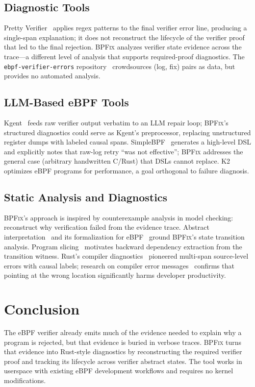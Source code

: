 \documentclass[sigplan,10pt,anonymous,review]{acmart}
\newcommand{\sys}{\textsc{BPFix}\xspace}
\begin{document}
\subsection{Diagnostic Tools}

Pretty Verifier~\cite{prettyverifier2025} applies regex patterns to the final
verifier error line, producing a single-span explanation; it does not reconstruct
the lifecycle of the verifier proof that led to the final rejection.  \sys
analyzes verifier state evidence across the trace---a different level of
analysis that supports required-proof diagnostics.
The \texttt{ebpf-verifier-errors} repository~\cite{ebpfverifdict} crowdsources
(log, fix) pairs as data, but provides no automated analysis.

\subsection{LLM-Based eBPF Tools}

Kgent~\cite{kgent2024} feeds raw verifier output verbatim to an LLM repair loop;
{\sys}'s structured diagnostics could serve as Kgent's preprocessor, replacing
unstructured register dumps with labeled causal spans.  SimpleBPF~\cite{simplebpf2025}
generates a high-level DSL and explicitly notes that raw-log retry ``was not effective'';
\sys addresses the general case (arbitrary handwritten C/Rust) that DSLs cannot
replace.  K2~\cite{k22023} optimizes eBPF programs for performance, a goal
orthogonal to failure diagnosis.

\subsection{Static Analysis and Diagnostics}

{\sys}'s approach is inspired by counterexample analysis in model checking:
reconstruct why verification failed from the evidence trace.  Abstract
interpretation~\cite{cousot1977} and its formalization for eBPF~\cite{gershuni2019simple}
ground {\sys}'s state transition analysis.  Program slicing~\cite{weiser1981} motivates
backward dependency extraction from the transition witness.  Rust's compiler
diagnostics~\cite{rustdiag2016} pioneered multi-span source-level errors with
causal labels; research on compiler error messages~\cite{errormessages2014} confirms
that pointing at the wrong location significantly harms developer productivity.

\section{Conclusion}

The eBPF verifier already emits much of the evidence needed to explain why a
program is rejected, but that evidence is buried in verbose traces.  \sys turns
that evidence into Rust-style diagnostics by reconstructing the required
verifier proof and tracking its lifecycle across verifier abstract states.  The
tool works in userspace with existing eBPF development workflows and requires no
kernel modifications.



\end{document}
